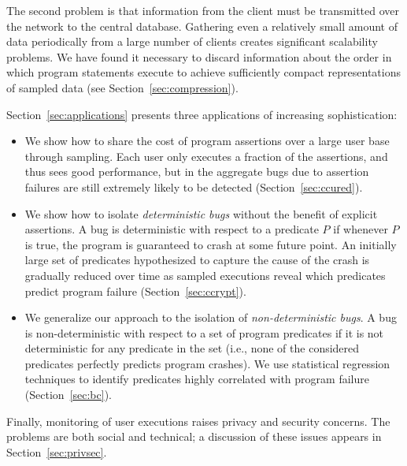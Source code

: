The second problem is that information from the client must be
transmitted over the network to the central database.  Gathering even
a relatively small amount of data periodically from a large number of
clients creates significant scalability problems.  We have found it necessary
to discard information about the order in which program statements execute
to achieve sufficiently compact representations of sampled data
(see Section~\ref{sec:compression}).

Section~\ref{sec:applications} presents three applications
of increasing sophistication:
\begin{itemize}
\item   We show how to
share the cost of program assertions over a large user base through
sampling.  Each user only executes a fraction of the assertions, and
thus sees good performance, but in the aggregate bugs due to assertion
failures are still extremely likely to be detected (Section~\ref{sec:ccured}). 

\item We show how to isolate {\em deterministic bugs} without the
benefit of explicit assertions.  A bug is deterministic with respect
to a predicate $P$ if whenever $P$ is true, the program is guaranteed
to crash at some future point.  An initially large set of predicates
hypothesized to capture the cause of the crash is gradually reduced
over time as sampled executions reveal which predicates predict
program failure (Section~\ref{sec:ccrypt}).


\item We generalize our approach to the isolation of
{\em non-deterministic bugs}.  A bug is non-deterministic with respect
to a set of program predicates if it is not deterministic for any
predicate in the set (i.e., none of the considered predicates
perfectly predicts program crashes).  We use statistical regression
techniques to identify predicates highly correlated with program
failure (Section~\ref{sec:bc}).

\end{itemize}

Finally, monitoring of user executions raises privacy
and security concerns.  The problems are both social and technical; a
discussion of these issues appears in Section~\ref{sec:privsec}.

